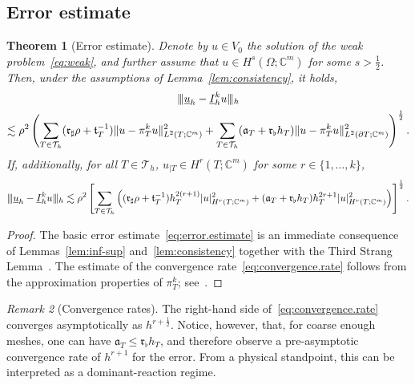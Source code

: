 \documentclass[11pt,a4paper]{article}
\theoremstyle{plain}
\newtheorem{theorem}{Theorem}
\theoremstyle{remark}
\newtheorem{remark}[theorem]{Remark}
\theoremstyle{definition}
\newcommand{\Complex}{\mathbb{C}}
\newcommand{\Th}{\mathcal{T}_h}
\newcommand{\lproj}[2]{\pi^{#1}_{#2}}
\newcommand{\Ih}{\underline{I}_h^k}
\newcommand{\norm}[2]{\|#2\|_{#1}}
\newcommand{\seminorm}[2]{|#2|_{#1}}
\newcommand{\tnorm}[2]{|\kern-0.25ex|\kern-0.25ex|#2|\kern-0.25ex|\kern-0.25ex|_{#1}}
\newcommand{\Aref}[1][T]{\mathfrak{a}_{#1}}
\newcommand{\tref}{\mathfrak{t}_T}
\newcommand{\Kmin}{\mathfrak{r}_\flat}
\newcommand{\Kmax}{\mathfrak{r}_\sharp}
\begin{document}
\subsection{Error estimate}

\begin{theorem}[Error estimate]\label{th:err-est}
  Denote by $u \in V_0$ the solution of the weak problem~\eqref{eq:weak}, and further assume that $u \in H^s(\Omega;\Complex^m)$ for some $s > \frac12$.
  Then, under the assumptions of Lemma~\ref{lem:consistency}, it holds,
  \begin{multline}\label{eq:error.estimate}
    \tnorm{h}{\underline{u}_h - \Ih u}
    \\
    \lesssim
    \rho^2 \left(
    \sum_{T \in \Th} (\Kmax \rho + \tref^{-1}) \norm{L^2(T;\Complex^m)}{u - \lproj{k}{T}u}^2
    + \sum_{T \in \Th} (\Aref + \Kmin h_T) \norm{L^2(\partial T;\Complex^m)}{u - \lproj{k}{T}u}^2
    \right)^{\frac12}.
  \end{multline}
  If, additionally, for all $T \in \Th$, $u_{|T} \in H^r(T;\Complex^m)$ for some $r \in \{ 1, \ldots, k\}$,
  \begin{equation}\label{eq:convergence.rate}
    \tnorm{h}{\underline{u}_h - \Ih u}
    \lesssim
    \rho^2 \left[
      \sum_{T \in \Th} \left(
      (\Kmax \rho + \tref^{-1}) h_T^{2(r + 1)} \seminorm{H^r(T;\Complex^m)}{u}^2
      + (\Aref + \Kmin h_T) h_T^{2r + 1} \seminorm{H^r(T;\Complex^m)}{u}^2
      \right)
      \right]^{\frac12}.
  \end{equation}
\end{theorem}

\begin{proof}
  The basic error estimate~\eqref{eq:error.estimate} is an immediate consequence of Lemmas~\ref{lem:inf-sup} and~\ref{lem:consistency} together with the Third Strang Lemma~\cite{Di-Pietro.Droniou:18}.
  The estimate of the convergence rate~\eqref{eq:convergence.rate} follows from the approximation properties of $\lproj{k}{T}$; see~\cite{Di-Pietro.Droniou:17}.
\end{proof}

\begin{remark}[Convergence rates]\label{rem:convergence.rates}
  The right-hand side of~\eqref{eq:convergence.rate} converges asymptotically as $h^{r+\frac12}$.
  Notice, however, that, for coarse enough meshes, one can have $\Aref \le \Kmin h_T$, and therefore observe a pre-asymptotic convergence rate of $h^{r+1}$ for the error.
  From a physical standpoint, this can be interpreted as a dominant-reaction regime.
\end{remark}
\end{document}
